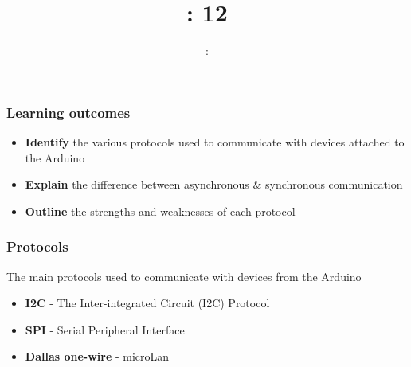 \usepackage{../../beamerthemeFalmouthGamesAcademy}
\usepackage{multimedia}
\graphicspath{ {../../} }


\usepackage[normalem]{ulem}
\usepackage{wasysym}
\usepackage{listings}
\usepackage{pdfpages}

\usetikzlibrary{arrows,automata}




\title{\sessionnumber: 12}
\subtitle{\modulecode: \moduletitle}

\frame{\titlepage}

\begin{frame}
	\frametitle{Learning outcomes}
	\begin{itemize}
		\item \textbf{Identify} the various protocols used to communicate with devices attached to the Arduino
		\item \textbf{Explain} the difference between asynchronous \& synchronous communication
		\item \textbf{Outline} the strengths and weaknesses of each protocol
	\end{itemize}
\end{frame}

\begin{frame}
	\frametitle{Protocols}
	The main protocols used to communicate with devices from the Arduino
	\begin{itemize}
		\item \textbf{I2C} - The Inter-integrated Circuit (I2C) Protocol
		\item \textbf{SPI} - Serial Peripheral Interface
		\item \textbf{Dallas one-wire} - microLan
	\end{itemize}
\end{frame}

